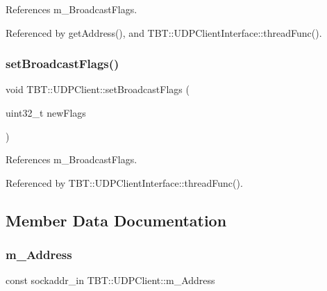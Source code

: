 References m\+\_\+\+Broadcast\+Flags.



Referenced by get\+Address(), and T\+B\+T\+::\+U\+D\+P\+Client\+Interface\+::thread\+Func().

\mbox{\label{classTBT_1_1UDPClient_a23a0b0ecf47f8a2fe018a570f46ecdfe_a23a0b0ecf47f8a2fe018a570f46ecdfe}} 
\subsubsection{\texorpdfstring{set\+Broadcast\+Flags()}{setBroadcastFlags()}}
{\footnotesize\ttfamily void T\+B\+T\+::\+U\+D\+P\+Client\+::set\+Broadcast\+Flags (\begin{DoxyParamCaption}\item[{uint32\+\_\+t}]{new\+Flags }\end{DoxyParamCaption})\hspace{0.3cm}{\ttfamily [inline]}}



References m\+\_\+\+Broadcast\+Flags.



Referenced by T\+B\+T\+::\+U\+D\+P\+Client\+Interface\+::thread\+Func().



\subsection{Member Data Documentation}
\mbox{\label{classTBT_1_1UDPClient_a880ede9d0208905a251bbfd221646e3b_a880ede9d0208905a251bbfd221646e3b}} 
\subsubsection{\texorpdfstring{m\+\_\+\+Address}{m\_Address}}
{\footnotesize\ttfamily const sockaddr\+\_\+in T\+B\+T\+::\+U\+D\+P\+Client\+::m\+\_\+\+Address\hspace{0.3cm}{\ttfamily [protected]}}



